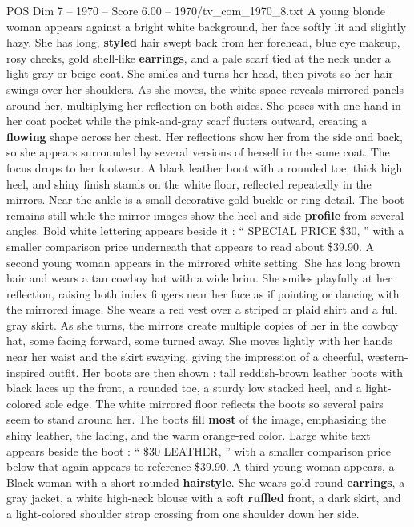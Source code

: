 \begin{textsample}{POS Dim 7 – 1970 – Score 6.00 – 1970/tv\_com\_1970\_8.txt}  \label{ex:f7_pos_039}
A young blonde woman appears against a bright white background, her face softly lit and slightly hazy.
She has long, \textbf{styled} hair swept back from her forehead, blue eye makeup, rosy cheeks, gold shell-like \textbf{earrings}, and a pale scarf tied at the neck under a light gray or beige coat.
She smiles and turns her head, then pivots so her hair swings over her shoulders.
As she moves, the white space reveals mirrored panels around her, multiplying her reflection on both sides.
She poses with one hand in her coat pocket while the pink-and-gray scarf flutters outward, creating a \textbf{flowing} shape across her chest.
Her reflections show her from the side and back, so she appears surrounded by several versions of herself in the same coat.
The focus drops to her footwear.
A black leather boot with a rounded toe, thick high heel, and shiny finish stands on the white floor, reflected repeatedly in the mirrors.
Near the ankle is a small decorative gold buckle or ring detail.
The boot remains still while the mirror images show the heel and side \textbf{profile} from several angles.
Bold white lettering appears beside it : “ SPECIAL PRICE \$30, ” with a smaller comparison price underneath that appears to read about \$39.90.
A second young woman appears in the mirrored white setting.
She has long brown hair and wears a tan cowboy hat with a wide brim.
She smiles playfully at her reflection, raising both index fingers near her face as if pointing or dancing with the mirrored image.
She wears a red vest over a striped or plaid shirt and a full gray skirt.
As she turns, the mirrors create multiple copies of her in the cowboy hat, some facing forward, some turned away.
She moves lightly with her hands near her waist and the skirt swaying, giving the impression of a cheerful, western-inspired outfit.
Her boots are then shown : tall reddish-brown leather boots with black laces up the front, a rounded toe, a sturdy low stacked heel, and a light-colored sole edge.
The white mirrored floor reflects the boots so several pairs seem to stand around her.
The boots fill \textbf{most} of the image, emphasizing the shiny leather, the lacing, and the warm orange-red color.
Large white text appears beside the boot : “ \$30 LEATHER, ” with a smaller comparison price below that again appears to reference \$39.90.
A third young woman appears, a Black woman with a short rounded \textbf{hairstyle}.
She wears gold round \textbf{earrings}, a gray jacket, a white high-neck blouse with a soft \textbf{ruffled} front, a dark skirt, and a light-colored shoulder strap crossing from one shoulder down her side.

\end{textsample}
